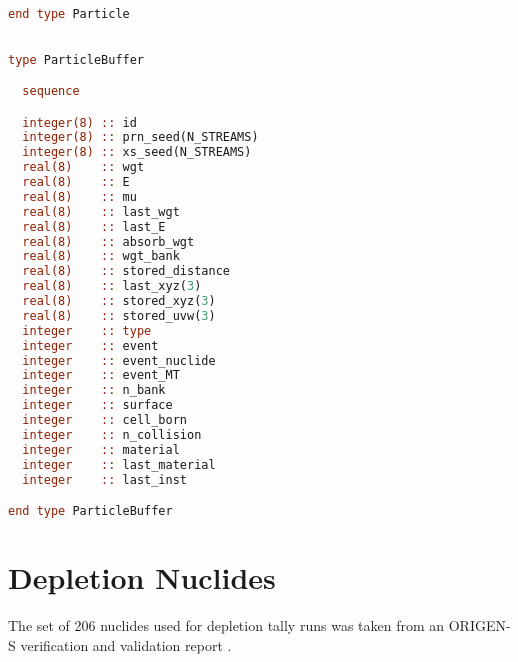 \begin{appendices}
\begin{lstlisting}[language=Fortran, frame=none, keepspaces=true, frame=single, linewidth=6in, xleftmargin=0.0in,
caption={Full OpenMC particle data structure. \label{lst:particle}}]
end type Particle

\end{lstlisting}
\onehalfspacing

\singlespacing
\begin{lstlisting}[language=Fortran, frame=none, keepspaces=true, frame=single, linewidth=6in, xleftmargin=0.0in,
caption={OpenMC particle buffer data structure. \label{lst:particle_buff}}]

type ParticleBuffer

  sequence

  integer(8) :: id
  integer(8) :: prn_seed(N_STREAMS)
  integer(8) :: xs_seed(N_STREAMS)
  real(8)    :: wgt
  real(8)    :: E
  real(8)    :: mu
  real(8)    :: last_wgt
  real(8)    :: last_E
  real(8)    :: absorb_wgt
  real(8)    :: wgt_bank
  real(8)    :: stored_distance
  real(8)    :: last_xyz(3)
  real(8)    :: stored_xyz(3)
  real(8)    :: stored_uvw(3)
  integer    :: type
  integer    :: event
  integer    :: event_nuclide
  integer    :: event_MT
  integer    :: n_bank
  integer    :: surface
  integer    :: cell_born
  integer    :: n_collision
  integer    :: material
  integer    :: last_material
  integer    :: last_inst

end type ParticleBuffer

\end{lstlisting}
\onehalfspacing

\chapter{Depletion Nuclides}
\label{app:nuclides}

The set of 206 nuclides used for depletion tally runs was taken from an ORIGEN-S
verification and validation report \cite{nuclides206}.


\end{appendices}
